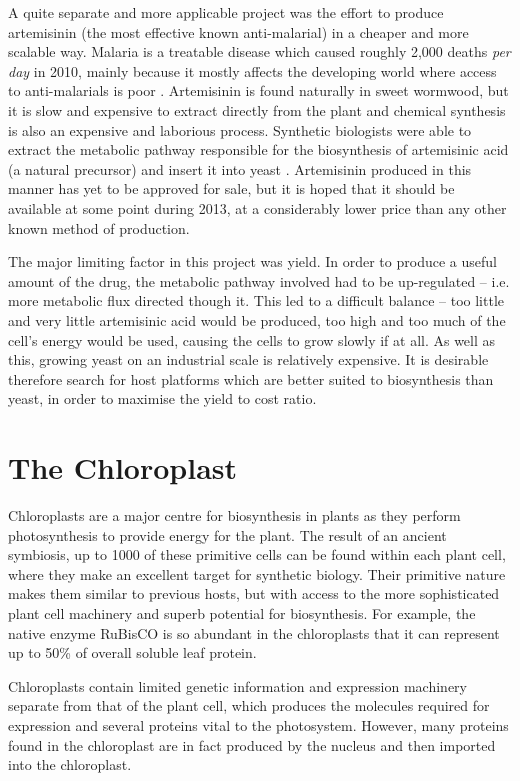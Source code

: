A quite separate and more applicable project was the effort to produce 
artemisinin (the most effective known anti-malarial) in a cheaper and more 
scalable way.
Malaria is a treatable disease which caused roughly 2,000 deaths 
\emph{per day} in 2010, mainly because it mostly affects the developing world 
where access to anti-malarials is poor \citep{malaria}.
Artemisinin is found naturally in sweet wormwood, but it is slow and expensive
to extract directly from the plant and chemical synthesis is also an expensive
and laborious process.
Synthetic biologists were able to extract the metabolic pathway responsible for
the biosynthesis of artemisinic acid (a natural precursor) and insert it into 
yeast \citep{yeast}.
Artemisinin produced in this manner has yet to be approved for sale, but it is
hoped that it should be available at some point during 2013, at a considerably
lower price than any other known method of production.

The major limiting factor in this project was yield.
In order to produce a useful amount of the drug, the metabolic pathway 
involved had to be up-regulated -- i.e. more metabolic flux directed though it.
This led to a difficult balance -- too little and very little
artemisinic acid would be produced, too high and too much of the cell's
energy would be used, causing the cells to grow slowly if at all.
As well as this, growing yeast on an industrial scale is relatively expensive.
It is desirable therefore search for host platforms which are better suited to
biosynthesis than yeast, in order to maximise the yield to cost ratio.

\section{The Chloroplast}
\label{sec:intro_chloroplast}

Chloroplasts are a major centre for biosynthesis in plants as they perform
photosynthesis to provide energy for the plant.
The result of an ancient symbiosis, up to 1000 of these primitive cells can be 
found within each plant cell, where they make an excellent target for synthetic
biology.
Their primitive nature makes them similar to previous hosts, 
but with access to the more sophisticated plant cell machinery and 
superb potential for biosynthesis.
For example, the native enzyme RuBisCO is so abundant in the chloroplasts that 
it can represent up to 50\% of overall soluble leaf protein.

Chloroplasts contain limited genetic information and expression machinery 
separate from that of the plant cell, which produces the molecules required 
for expression and several proteins vital to the photosystem.
However, many proteins found in the chloroplast are in fact produced by the
nucleus and then imported into the chloroplast.

